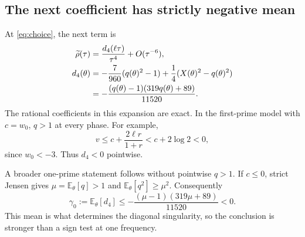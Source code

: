 \documentclass[11pt]{article}
\numberwithin{equation}{section}
\theoremstyle{definition}
\theoremstyle{remark}
\newcommand{\avg}[1]{\mathbb E_{\theta}\!\left[#1\right]}
\begin{document}
\subsection{The next coefficient has strictly negative mean}
At \eqref{eq:choice}, the next term is
\begin{align}
 \widetilde\rho(\tau)&=\frac{d_4(\ell\tau)}{\tau^4}+O(\tau^{-6}),
 \label{eq:rho4}\\
 d_4(\theta)&=-\frac7{960}(q(\theta)^2-1)
                +\frac14(X(\theta)^2-q(\theta)^2)\notag\\
 &=-\frac{(q(\theta)-1)(319q(\theta)+89)}{11520}.
 \label{eq:d4}
\end{align}
The rational coefficients in this expansion are exact. In the first-prime model with $c=w_0$, $q>1$ at every phase. For example,
\begin{equation}
 v\le c+\frac{2\ell r}{1+r}<c+2\log2<0,
\end{equation}
since $w_0<-3$. Thus $d_4<0$ pointwise.

A broader one-prime statement follows without pointwise $q>1$. If $c\le0$, strict Jensen gives $\mu=\avg q>1$ and $\avg{q^2}\ge\mu^2$. Consequently
\begin{equation}
 \gamma_0:=\avg{d_4}
 \le-\frac{(\mu-1)(319\mu+89)}{11520}<0.
 \label{eq:gamma0}
\end{equation}
This mean is what determines the diagonal singularity, so the conclusion is stronger than a sign test at one frequency.
\end{document}
